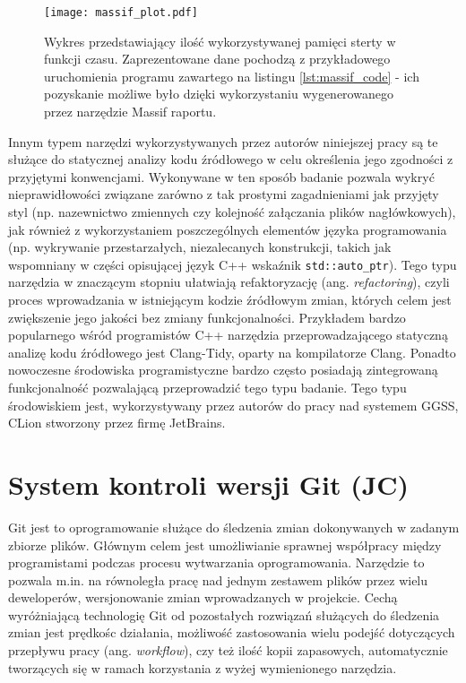 \begin{figure}[H]
\centering
\texttt{[image: massif\_plot.pdf]}
\caption{Wykres przedstawiający ilość wykorzystywanej pamięci sterty w funkcji czasu. Zaprezentowane dane pochodzą z przykładowego uruchomienia programu zawartego na listingu \ref{lst:massif_code} - ich pozyskanie możliwe było dzięki wykorzystaniu wygenerowanego przez narzędzie Massif raportu.}
\label{fig:massif_plot}
\end{figure}

Innym typem narzędzi wykorzystywanych przez autorów niniejszej pracy są te służące do statycznej analizy kodu źródłowego w celu określenia jego zgodności z przyjętymi konwencjami. Wykonywane w ten sposób badanie pozwala wykryć nieprawidłowości związane zarówno z tak prostymi zagadnieniami jak przyjęty styl (np. nazewnictwo zmiennych czy kolejność załączania plików nagłówkowych), jak również z wykorzystaniem poszczególnych elementów języka programowania (np. wykrywanie przestarzałych, niezalecanych konstrukcji, takich jak wspomniany w części opisującej język C++ wskaźnik \lstinline{std::auto_ptr}). Tego typu narzędzia w znaczącym stopniu ułatwiają refaktoryzację (ang. \emph{refactoring}), czyli proces wprowadzania w istniejącym kodzie źródłowym zmian, których celem jest zwiększenie jego jakości bez zmiany funkcjonalności. Przykładem bardzo popularnego wśród programistów C++ narzędzia przeprowadzającego statyczną analizę kodu źródłowego jest Clang-Tidy, oparty na kompilatorze Clang. Ponadto nowoczesne środowiska programistyczne bardzo często posiadają zintegrowaną funkcjonalność pozwalającą przeprowadzić tego typu badanie. Tego typu środowiskiem jest, wykorzystywany przez autorów do pracy nad systemem GGSS, CLion stworzony przez firmę JetBrains.


\section{System kontroli wersji Git (JC)} %
Git jest to oprogramowanie służące do śledzenia zmian dokonywanych w zadanym zbiorze plików. Głównym celem jest umożliwianie sprawnej współpracy między programistami podczas procesu wytwarzania oprogramowania. Narzędzie to pozwala m.in. na równoległa pracę nad jednym zestawem plików przez wielu deweloperów, wersjonowanie zmian wprowadzanych w projekcie. Cechą wyróżniającą technologię Git od pozostałych rozwiązań służących do śledzenia zmian jest prędkośc działania, możliwość zastosowania wielu podejść dotyczących przepływu pracy (ang. \emph{workflow}), czy też ilość kopii zapasowych, automatycznie tworzących się w ramach korzystania z wyżej wymienionego narzędzia.

